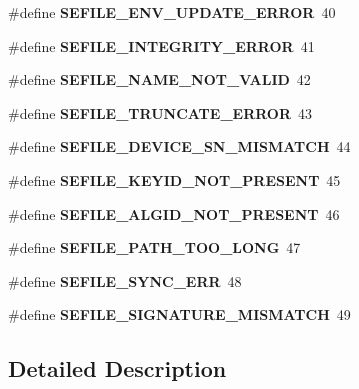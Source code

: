 \begin{DoxyCompactItemize}
\item 
\hypertarget{group__error_values_ga35d130b08fd47835ac8434089996f511}{\#define {\bfseries S\-E\-F\-I\-L\-E\-\_\-\-E\-N\-V\-\_\-\-U\-P\-D\-A\-T\-E\-\_\-\-E\-R\-R\-O\-R}~40}\label{group__error_values_ga35d130b08fd47835ac8434089996f511}

\item 
\hypertarget{group__error_values_ga62143add129dfcbec6512f7f531309ce}{\#define {\bfseries S\-E\-F\-I\-L\-E\-\_\-\-I\-N\-T\-E\-G\-R\-I\-T\-Y\-\_\-\-E\-R\-R\-O\-R}~41}\label{group__error_values_ga62143add129dfcbec6512f7f531309ce}

\item 
\hypertarget{group__error_values_ga99a623f4578c42e52fec20d4773d4004}{\#define {\bfseries S\-E\-F\-I\-L\-E\-\_\-\-N\-A\-M\-E\-\_\-\-N\-O\-T\-\_\-\-V\-A\-L\-I\-D}~42}\label{group__error_values_ga99a623f4578c42e52fec20d4773d4004}

\item 
\hypertarget{group__error_values_gab67139e5ac7e0fdda43b7df3efa82ae6}{\#define {\bfseries S\-E\-F\-I\-L\-E\-\_\-\-T\-R\-U\-N\-C\-A\-T\-E\-\_\-\-E\-R\-R\-O\-R}~43}\label{group__error_values_gab67139e5ac7e0fdda43b7df3efa82ae6}

\item 
\hypertarget{group__error_values_ga43bb90520aa942643136bacf666646ab}{\#define {\bfseries S\-E\-F\-I\-L\-E\-\_\-\-D\-E\-V\-I\-C\-E\-\_\-\-S\-N\-\_\-\-M\-I\-S\-M\-A\-T\-C\-H}~44}\label{group__error_values_ga43bb90520aa942643136bacf666646ab}

\item 
\hypertarget{group__error_values_gae714c3753d850fabe5cf9d0776f069cb}{\#define {\bfseries S\-E\-F\-I\-L\-E\-\_\-\-K\-E\-Y\-I\-D\-\_\-\-N\-O\-T\-\_\-\-P\-R\-E\-S\-E\-N\-T}~45}\label{group__error_values_gae714c3753d850fabe5cf9d0776f069cb}

\item 
\hypertarget{group__error_values_ga74d06ed9a59c21093dd0ab040162bdcf}{\#define {\bfseries S\-E\-F\-I\-L\-E\-\_\-\-A\-L\-G\-I\-D\-\_\-\-N\-O\-T\-\_\-\-P\-R\-E\-S\-E\-N\-T}~46}\label{group__error_values_ga74d06ed9a59c21093dd0ab040162bdcf}

\item 
\hypertarget{group__error_values_ga9d0494548ef592b9b778d89162d51149}{\#define {\bfseries S\-E\-F\-I\-L\-E\-\_\-\-P\-A\-T\-H\-\_\-\-T\-O\-O\-\_\-\-L\-O\-N\-G}~47}\label{group__error_values_ga9d0494548ef592b9b778d89162d51149}

\item 
\hypertarget{group__error_values_gae22cec823d2d3e831fd1af8e769fa7b8}{\#define {\bfseries S\-E\-F\-I\-L\-E\-\_\-\-S\-Y\-N\-C\-\_\-\-E\-R\-R}~48}\label{group__error_values_gae22cec823d2d3e831fd1af8e769fa7b8}

\item 
\hypertarget{group__error_values_gadcb1402e3f630353dfc26774c319db57}{\#define {\bfseries S\-E\-F\-I\-L\-E\-\_\-\-S\-I\-G\-N\-A\-T\-U\-R\-E\-\_\-\-M\-I\-S\-M\-A\-T\-C\-H}~49}\label{group__error_values_gadcb1402e3f630353dfc26774c319db57}

\end{DoxyCompactItemize}


\subsection{Detailed Description}
